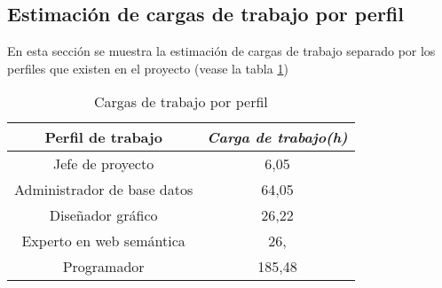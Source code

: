\subsection{Estimación de cargas de trabajo por perfil}

En esta sección se muestra la estimación de cargas de trabajo separado por los perfiles que existen en el proyecto (vease la tabla \ref{tab:workload})

\begin{table}[htp]
	\centering
	\caption{Cargas de trabajo por perfil}\label{tab:workload}
	\begin{tabular}{cc}
		\toprule
    	\textbf{Perfil de trabajo} & \emph{Carga de trabajo(h)}\\
    	\midrule
		Jefe de proyecto & 6,05\\
		Administrador de base datos & 64,05\\
		Diseñador gráfico & 26,22\\
		Experto en web semántica & 26,\\
		Programador & 185,48\\
    	\bottomrule
    \end{tabular}
\end{table}